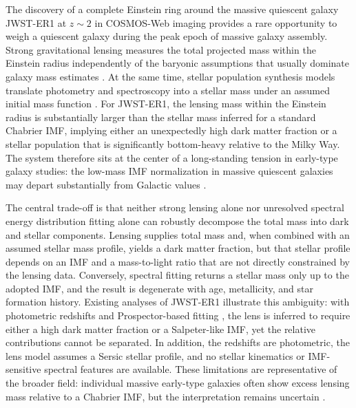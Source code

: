 \documentclass{article}
\begin{document}
The discovery of a complete Einstein ring around the massive quiescent galaxy JWST-ER1 at $z\sim2$ in COSMOS-Web imaging \cite{vandokkum2023jwster1,casey2023cosmosweb} provides a rare opportunity to weigh a quiescent galaxy during the peak epoch of massive galaxy assembly. Strong gravitational lensing measures the total projected mass within the Einstein radius independently of the baryonic assumptions that usually dominate galaxy mass estimates \cite{treu2010stronglensing}. At the same time, stellar population synthesis models translate photometry and spectroscopy into a stellar mass under an assumed initial mass function \cite{conroy2013imfsps}. For JWST-ER1, the lensing mass within the Einstein radius is substantially larger than the stellar mass inferred for a standard Chabrier IMF, implying either an unexpectedly high dark matter fraction or a stellar population that is significantly bottom-heavy relative to the Milky Way. The system therefore sits at the center of a long-standing tension in early-type galaxy studies: the low-mass IMF normalization in massive quiescent galaxies may depart substantially from Galactic values \cite{vandokkum2010bottomheavy,spiniello2014imf}.

The central trade-off is that neither strong lensing alone nor unresolved spectral energy distribution fitting alone can robustly decompose the total mass into dark and stellar components. Lensing supplies total mass and, when combined with an assumed stellar mass profile, yields a dark matter fraction, but that stellar profile depends on an IMF and a mass-to-light ratio that are not directly constrained by the lensing data. Conversely, spectral fitting returns a stellar mass only up to the adopted IMF, and the result is degenerate with age, metallicity, and star formation history. Existing analyses of JWST-ER1 \cite{vandokkum2023jwster1} illustrate this ambiguity: with photometric redshifts and Prospector-based fitting \cite{leja2017prospector}, the lens is inferred to require either a high dark matter fraction or a Salpeter-like IMF, yet the relative contributions cannot be separated. In addition, the redshifts are photometric, the lens model assumes a Sersic stellar profile, and no stellar kinematics or IMF-sensitive spectral features are available. These limitations are representative of the broader field: individual massive early-type galaxies often show excess lensing mass relative to a Chabrier IMF, but the interpretation remains uncertain \cite{sonnenfeld2015darkmatter,barnabe2011joint}.
\end{document}

